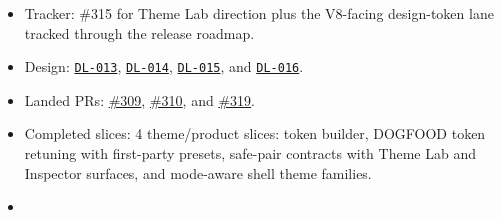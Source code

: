 \begin{itemize}
\tightlist
\item
  Tracker: \#315 for Theme Lab direction plus the V8-facing design-token lane tracked through the release roadmap.
\item
  Design: \href{https://github.com/flyingrobots/bijou/blob/cbd70612140e7a450d764b3c7be1c6af878b99bc/docs/design/DL-013-design-token-theme-builder-api.md}{\texttt{D\allowbreak{}L\allowbreak{}-\allowbreak{}0\allowbreak{}1\allowbreak{}3}}, \href{https://github.com/flyingrobots/bijou/blob/cbd70612140e7a450d764b3c7be1c6af878b99bc/docs/design/DL-014-theme-inspector-and-lab.md}{\texttt{D\allowbreak{}L\allowbreak{}-\allowbreak{}0\allowbreak{}1\allowbreak{}4}}, \href{https://github.com/flyingrobots/bijou/blob/cbd70612140e7a450d764b3c7be1c6af878b99bc/docs/design/DL-015-theme-safe-pairs-and-contrast-matrices.md}{\texttt{D\allowbreak{}L\allowbreak{}-\allowbreak{}0\allowbreak{}1\allowbreak{}5}}, and \href{https://github.com/flyingrobots/bijou/blob/cbd70612140e7a450d764b3c7be1c6af878b99bc/docs/design/DL-016-mode-aware-runtime-theme-adapter.md}{\texttt{D\allowbreak{}L\allowbreak{}-\allowbreak{}0\allowbreak{}1\allowbreak{}6}}.
\item
  Landed PRs: \href{https://github.com/flyingrobots/bijou/pull/309}{\#309}, \href{https://github.com/flyingrobots/bijou/pull/310}{\#310}, and \href{https://github.com/flyingrobots/bijou/pull/319}{\#319}.
\item
  Completed slices: 4 theme/product slices: token builder, DOGFOOD token retuning with first-party presets, safe-pair contracts with Theme Lab and Inspector surfaces, and mode-aware shell theme families.
\item

\end{itemize}
